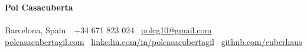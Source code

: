\documentclass[10pt,a4paper]{article}
\makeatletter
\providecommand{\atslocation}{Barcelona, Spain}
\newcommand{\atsheader}{%
  {\LARGE\textbf{Pol Casacuberta}}\\
  {\large \atsposition}\\
  \atslocation\ \textbar\ +34 671 823 024 \textbar\ \href{mailto:polcg10@gmail.com}{polcg10@gmail.com}\\
  \href{https://polcasacubertagil.com}{polcasacubertagil.com} \textbar\ \href{https://www.linkedin.com/in/polcasacubertagil}{linkedin.com/in/polcasacubertagil} \textbar\ \href{https://github.com/cuberhaus}{github.com/cuberhaus}\\
  \atslanguages\par
}
\makeatother
\begin{document}
\atsheader

\end{document}
